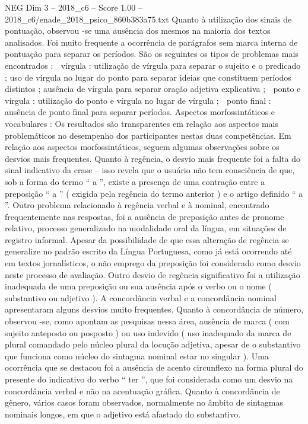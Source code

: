 \begin{textsample}{NEG Dim 3 – 2018\_c6 – Score 1.00 – 2018\_c6/enade\_2018\_psico\_860b383a75.txt}
Quanto à utilização dos sinais de pontuação, observou -se uma ausência dos mesmos na maioria dos textos analisados.
Foi muito frequente a ocorrência de parágrafos sem marca interna de pontuação para separar os períodos.
São os seguintes os tipos de problemas mais encontrados :  vírgula : utilização de vírgula para separar o sujeito e o predicado ; uso de vírgula no lugar do ponto para separar ideias que constituem períodos distintos ; ausência de vírgula para separar oração adjetiva explicativa ;  ponto e vírgula : utilização do ponto e vírgula no lugar de vírgula ;  ponto final : ausência de ponto final para separar períodos.
Aspectos morfossintáticos e vocabulares : Os resultados são transparentes em relação aos aspectos mais problemáticos no desempenho dos participantes nestas duas competências.
Em relação aos aspectos morfossintáticos, seguem algumas observações sobre os desvios mais frequentes.
Quanto à regência, o desvio mais frequente foi a falta do sinal indicativo da crase – isso revela que o usuário não tem consciência de que, sob a forma do termo “ a ”, existe a presença de uma contração entre a preposição “ a ” ( exigida pela regência do termo anterior ) e o artigo definido “ a ”.
Outro problema relacionado à regência verbal e à nominal, encontrado frequentemente nas respostas, foi a ausência de preposição antes de pronome relativo, processo generalizado na modalidade oral da língua, em situações de registro informal.
Apesar da possibilidade de que essa alteração de regência se generalize no padrão escrito da Língua Portuguesa, como já está ocorrendo até em textos jornalísticos, o não emprego da preposição foi considerado como desvio neste processo de avaliação.
Outro desvio de regência significativo foi a utilização inadequada de uma preposição ou sua ausência após o verbo ou o nome ( substantivo ou adjetivo ).
A concordância verbal e a concordância nominal apresentaram alguns desvios muito frequentes.
Quanto à concordância de número, observou -se, como apontam as pesquisas nessa área, ausência de marca ( com sujeito anteposto ou posposto ) ou uso indevido ( uso inadequado da marca de plural comandado pelo núcleo plural da locução adjetiva, apesar de o substantivo que funciona como núcleo do sintagma nominal estar no singular ).
Uma ocorrência que se destacou foi a ausência de acento circunflexo na forma plural do presente do indicativo do verbo “ ter ”, que foi considerada como um desvio na concordância verbal e não na acentuação gráfica.
Quanto à concordância de gênero, vários casos foram observados, normalmente no âmbito de sintagmas nominais longos, em que o adjetivo está afastado do substantivo.

\end{textsample}
